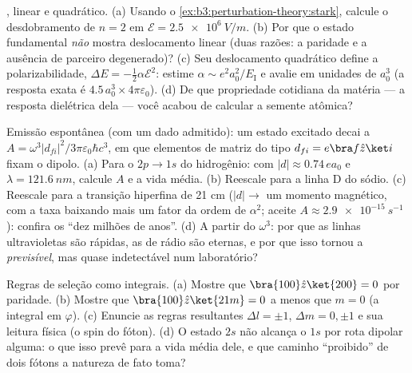 \begin{exercise}[$\star\star$]\label{exo:b3:perturbation-theory:7}
, linear e quadrático. (a) Usando o
\cref{ex:b3:perturbation-theory:stark}, calcule o desdobramento de
$n = 2$ em $\mathcal E = \qty{2.5e6}{V/m}$. (b) Por que o estado
fundamental \emph{não} mostra deslocamento linear (duas razões: a
paridade e a ausência de parceiro degenerado)? (c) Seu deslocamento
quadrático define a polarizabilidade,
$\Delta E = -\tfrac12\alpha\mathcal E^2$: estime
$\alpha \sim e^2a_0^2/E_{\text{I}}$ e avalie em unidades de
$a_0^3$ (a resposta exata é $4.5\,a_0^3 \times
4\pi\varepsilon_0$). (d) De que propriedade cotidiana da matéria --- a
resposta dielétrica dela --- você acabou de calcular a semente atômica?
\end{exercise}

\begin{exercise}[$\star\star$]\label{exo:b3:perturbation-theory:8}
Emissão espontânea (com um dado admitido): um estado excitado decai a
$A = \omega^3|d_{fi}|^2/3\pi\varepsilon_0\hbar c^3$, em que elementos
de matriz do tipo $d_{fi} = e\bra f\hat z\ket i$ fixam o dipolo. (a)
Para o $2p \to 1s$ do hidrogênio: com $|d| \approx 0.74\,
ea_0$ e $\lambda = \qty{121.6}{nm}$, calcule $A$ e a vida média. (b)
Reescale para a linha D do sódio. (c) Reescale para a transição
hiperfina de 21 cm ($|d| \to$ um momento magnético, com a taxa baixando
mais um fator da ordem de $\alpha^2$; aceite $A \approx
\qty{2.9e-15}{s^{-1}}$): confira os ``dez milhões de anos''. (d) A
partir do $\omega^3$: por que as linhas ultravioletas são rápidas, as
de rádio são eternas, e por que isso tornou a 
\emph{previsível}, mas quase indetectável num laboratório?
\end{exercise}

\begin{exercise}[$\star\star$]\label{exo:b3:perturbation-theory:9}
Regras de seleção como integrais. (a) Mostre que $\bra{100}\hat z\ket{200} =
0$ por paridade. (b) Mostre que $\bra{100}\hat z\ket{21m} = 0$ a menos que $m =
0$ (a integral em $\varphi$). (c) Enuncie as regras resultantes $\Delta
l = \pm1$, $\Delta m = 0, \pm1$ e sua leitura
física (o spin do fóton). (d) O estado $2s$ não alcança o $1s$ por rota
dipolar alguma: o que isso prevê para a vida média dele, e que caminho
``proibido'' de dois fótons a natureza de fato toma?
\end{exercise}

